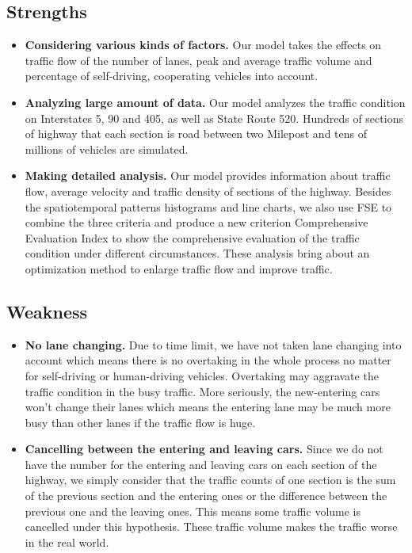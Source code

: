 \documentclass[a4paper]{article}
\begin{document}
	\subsection{Strengths}
	\begin{itemize}
		\item \textbf{Considering various kinds of factors. }Our model takes the effects on traffic flow of the number of lanes, peak and average traffic volume and percentage of self-driving, cooperating vehicles into account.
		\item \textbf{Analyzing large amount of data. }Our model analyzes the traffic condition on Interstates 5, 90 and 405, as well as State Route 520. Hundreds of sections of highway that each section is road between two Milepost and tens of millions of vehicles are simulated.
		\item \textbf{Making detailed analysis. }Our model provides information about traffic flow, average velocity and traffic density of sections of the highway. Besides the spatiotemporal patterns histograms and line charts, we also use FSE to combine the three criteria and produce a new criterion Comprehensive Evaluation Index to show the comprehensive evaluation of the traffic condition under different circumstances. These analysis bring about an optimization method to enlarge traffic flow and improve traffic.
	\end{itemize}
	\subsection{Weakness}
	\begin{itemize}
		\item \textbf{No lane changing.} Due to time limit, we have not taken lane changing into account which means there is no overtaking in the whole process no matter for self-driving or human-driving vehicles. Overtaking may aggravate the traffic condition in the busy traffic. More seriously, the new-entering cars won't change their lanes which means the entering lane may be much more busy than other lanes if the traffic flow is huge.
		\item \textbf{Cancelling between the entering and leaving cars.} Since we do not have the number for the entering and leaving cars on each section of the highway, we simply consider that the traffic counts of one section is the sum of the previous section and the entering ones or the difference between the previous one and the leaving ones. This means some traffic volume is cancelled under this hypothesis. These traffic volume makes the traffic worse in the real world.
	\end{itemize}
\end{document}

